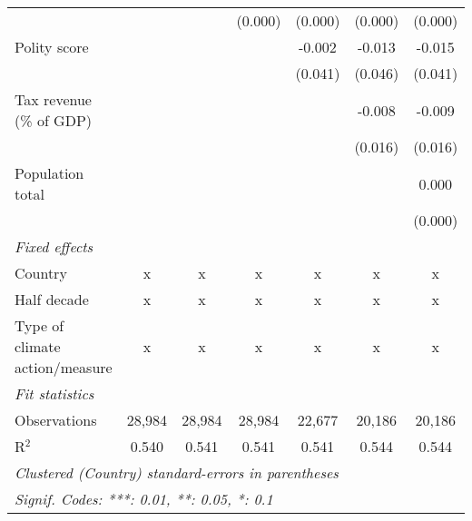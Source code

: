 \begin{tabular}{lcccccc}
                                                                                                   &         &         & (0.000)       & (0.000)       & (0.000)       & (0.000)\\   
   Polity score                                                                                    &         &         &               & -0.002        & -0.013        & -0.015\\   
                                                                                                   &         &         &               & (0.041)       & (0.046)       & (0.041)\\   
   Tax revenue (\% of GDP)                                                                         &         &         &               &               & -0.008        & -0.009\\   
                                                                                                   &         &         &               &               & (0.016)       & (0.016)\\   
   Population total                                                                                &         &         &               &               &               & 0.000\\   
                                                                                                   &         &         &               &               &               & (0.000)\\   
   \emph{Fixed effects}\\
   Country                                                                                         & x       & x       & x             & x             & x             & x\\  
   Half decade                                                                                     & x       & x       & x             & x             & x             & x\\  
   Type of climate action/measure                                                                  & x       & x       & x             & x             & x             & x\\  
   \midrule \emph{Fit statistics}\\
   Observations                                                                                    & 28,984  & 28,984  & 28,984        & 22,677        & 20,186        & 20,186\\  
   R$^2$                                                                                           & 0.540   & 0.541   & 0.541         & 0.541         & 0.544         & 0.544\\  
   \midrule
   \multicolumn{7}{l}{\emph{Clustered (Country) standard-errors in parentheses}}\\
   \multicolumn{7}{l}{\emph{Signif. Codes: ***: 0.01, **: 0.05, *: 0.1}}\\
\end{tabular}
\par\endgroup



